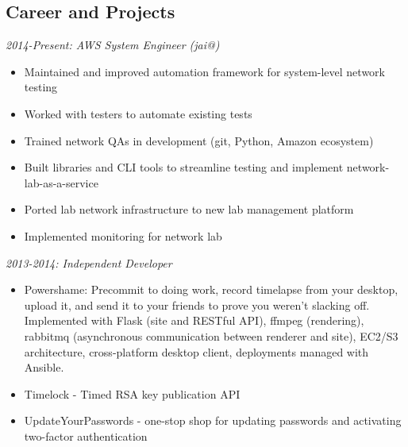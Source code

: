 \documentclass[line]{res} %
\begin{document}
\address{jai@jaibot.com - http://jaibot.com - 609 948 4264}
\begin{resume}
\section{Career and Projects} 

{\sl 2014-Present: AWS System Engineer (jai@)}
    \begin{itemize} 
        \item Maintained and improved automation framework for system-level network testing
        \item Worked with testers to automate existing tests
        \item Trained network QAs in development (git, Python, Amazon ecosystem)
        \item Built libraries and CLI tools to streamline testing and implement network-lab-as-a-service
        \item Ported lab network infrastructure to new lab management platform
        \item Implemented monitoring for network lab
    \end{itemize}

{\sl 2013-2014: Independent Developer }
    \begin{itemize} 
        \item Powershame: Precommit to doing work, record timelapse from your desktop, upload it, and send it to your friends to prove you weren't slacking off. Implemented with Flask (site and RESTful API), ffmpeg (rendering), rabbitmq (asynchronous communication between renderer and site), EC2/S3 architecture, cross-platform desktop client, deployments managed with Ansible.
    \item Timelock - Timed RSA key publication API
    \item UpdateYourPasswords - one-stop shop for updating passwords and activating two-factor authentication 
    \end{itemize}



\end{resume}
\end{document}

